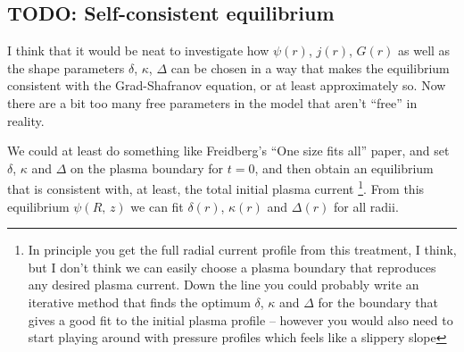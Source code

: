 \documentclass[11pt,a4paper]{article}
\newcommand{\rd}{\ensuremath{\mathrm{d}}}
\renewcommand{\b}[1]{\ensuremath{ {\bf #1 } }}
\begin{document}



\subsection{TODO: Self-consistent equilibrium}
I think that it would be neat to investigate how $\psi(r)$, $j(r)$, $G(r)$ as well as the shape parameters $\delta$, $\kappa$, $\Delta$ can be chosen in a way that makes the equilibrium consistent with the Grad-Shafranov equation, or at least approximately so. Now there are a bit too many free parameters in the model that aren't ``free'' in reality. %

We could at least do something like Freidberg's ``One size fits all'' paper, and set $\delta$, $\kappa$ and $\Delta$ on the plasma boundary for $t=0$, and then obtain an equilibrium that is consistent with, at least, the total initial plasma current \footnote{In principle you get the full radial current profile from this treatment, I think, but I don't think we can easily choose a plasma boundary that reproduces any desired plasma current. Down the line you could probably write an iterative method that finds the optimum $\delta$, $\kappa$ and $\Delta$ for the boundary that gives a good fit to the initial plasma profile -- however you would also need to start playing around with pressure profiles which feels like a slippery slope}. From this equilibrium $\psi(R,\,z)$ we can fit $\delta(r)$, $\kappa(r)$ and $\Delta(r)$ for all radii.
\end{document}
